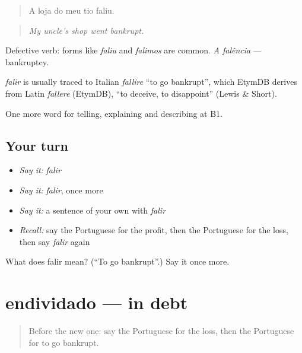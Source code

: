 \begin{quote}
A loja do meu tio faliu.
\end{quote}

\begin{quote}
\emph{My uncle's shop went bankrupt.}
\end{quote}

Defective verb: forms like \emph{faliu} and \emph{falimos} are common. \emph{A falência} — bankruptcy.

\begin{cousinweb}
\emph{falir} is usually traced to Italian \emph{fallire} \textquotedblleft{}to go bankrupt\textquotedblright{}, which EtymDB derives from Latin \emph{fallere} (EtymDB), \textquotedblleft{}to deceive, to disappoint\textquotedblright{} (Lewis \& Short).
\end{cousinweb}

\begin{grammarlens}[title={What you've built}]
One more word for telling, explaining and describing at B1.
\end{grammarlens}

\subsection*{Your turn}
\begin{itemize}
\raggedright
  \item \emph{Say it:} \emph{falir}
  \item \emph{Say it:} \emph{falir}, once more
  \item \emph{Say it:} a sentence of your own with \emph{falir}
  \item \emph{Recall:} say the Portuguese for the profit, then the Portuguese for the loss, then say \emph{falir} again
\end{itemize}

\begin{tcolorbox}[breakable,colback=teal!4,colframe=teal!35!black,title={Before you move on}]
What does falir mean? (\textquotedblleft{}To go bankrupt\textquotedblright{}.) Say it once more.
\end{tcolorbox}
\section[endividado]{endividado — in debt}

\label{lesson:PT-C395-endividado}



\begin{quote}
Before the new one: say the Portuguese for the loss, then the Portuguese for to go bankrupt.
\end{quote}

